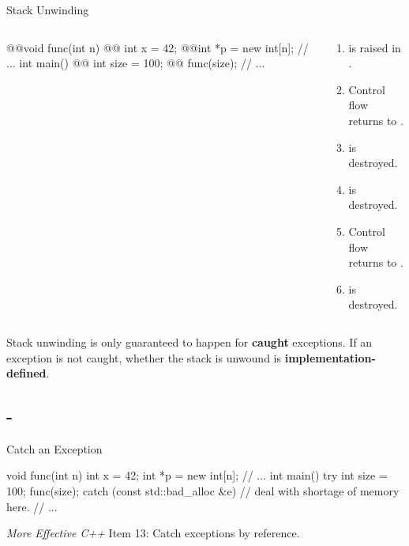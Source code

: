\documentclass{beamer}
\begin{document}
\begin{frame}[fragile]{Stack Unwinding}
  \begin{columns}
    \begin{column}{0.4\linewidth}
      \begin{cpp}
@\onslide<4>{\pinkbox}@void func(int n) {
@@  int x = 42;
@@int *p = new int[n];
  // ...
}
int main() {
@\onslide<6>{\pinkbox}@  int size = 100;
@@  func(size);
  // ...
}
      \end{cpp}
    \end{column}
    \begin{column}{0.6\linewidth}
      \begin{enumerate}
        \item {} is raised in \ttt{[]}.
        \item Control flow returns to .
        \item {} is destroyed.
        \item {} is destroyed.
        \item Control flow returns to .
        \item {} is destroyed.
      \end{enumerate}
    \end{column}
  \end{columns}
  \begin{notice}
    Stack unwinding is only guaranteed to happen for \textbf{caught} exceptions. If an exception is not caught, whether the stack is unwound is \textbf{implementation-defined}.
  \end{notice}
\end{frame}

\subsection{-}

\begin{frame}[fragile]{Catch an Exception}
  \begin{cpp}
void func(int n) {
  int x = 42;
  int *p = new int[n];
  // ...
}
int main() {
  try {
    int size = 100;
    func(size);
  } catch (const std::bad_alloc &e) {
    // deal with shortage of memory here.
  }
  // ...
}
  \end{cpp}
  \textit{More Effective C++} Item 13: Catch exceptions by reference.
\end{frame}
\end{document}
